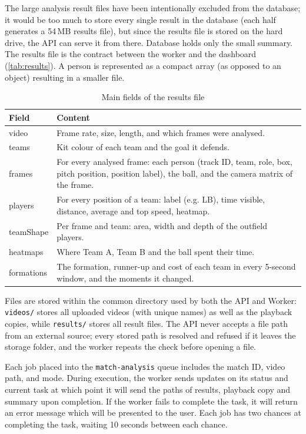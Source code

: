 The large analysis result files have been intentionally excluded from the database; it would be too much to store every single result in the database (each half generates a 54\,MB results file), but since the results file is stored on the hard drive, the API can serve it from there. Database holds only the small summary. The results file is the contract between the worker and the dashboard (\autoref{tab:results}). A person is represented as a compact array (as opposed to an object) resulting in a smaller file.

\begin{table}[H]
	\centering
	\begin{tabular}{|p{}|p{}|}
		\hline
		\textbf{Field} & \textbf{Content} \\
		\hline
		video & Frame rate, size, length, and which frames were analysed. \\
		\hline
		teams & Kit colour of each team and the goal it defends. \\
		\hline
		frames & For every analysed frame: each person (track ID, team, role, box, pitch position, position label), the ball, and the camera matrix of the frame. \\
		\hline
		players & For every position of a team: label (e.g. LB), time visible, distance, average and top speed, heatmap. \\
		\hline
		teamShape & Per frame and team: area, width and depth of the outfield players. \\
		\hline
		heatmaps & Where Team A, Team B and the ball spent their time. \\
		\hline
		formations & The formation, runner-up and cost of each team in every 5-second window, and the moments it changed. \\
		\hline
	\end{tabular}
	\caption{Main fields of the results file}
	\label{tab:results}
\end{table}

Files are stored within the common directory used by both the API and Worker: \texttt{videos/} stores all uploaded videos (with unique names) as well as the playback copies, while \texttt{results/} stores all result files. The API never accepts a file path from an external source; every stored path is resolved and refused if it leaves the storage folder, and the worker repeats the check before opening a file.

Each job placed into the \texttt{match-analysis} queue includes the match ID, video path, and mode. During execution, the worker sends updates on its status and current task at which point it will send the paths of results, playback copy and summary upon completion. If the worker fails to complete the task, it will return an error message which will be presented to the user. Each job has two chances at completing the task, waiting 10 seconds between each chance.

